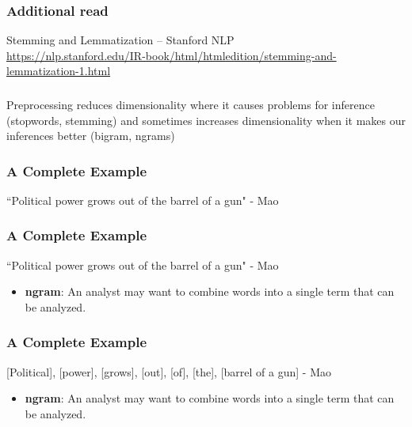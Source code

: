 \documentclass[compress, aspectratio=54]{beamer}
\begin{document}
\begin{frame}
\frametitle{Additional read}
Stemming and Lemmatization -- Stanford NLP\\
\url{https://nlp.stanford.edu/IR-book/html/htmledition/stemming-and-lemmatization-1.html}
\end{frame}

\begin{frame}
\frametitle{}
Preprocessing reduces dimensionality where it causes problems for
inference (stopwords, stemming) and sometimes increases
dimensionality when it makes our inferences better (bigram, ngrams)
\end{frame}

\begin{frame}
\frametitle{A Complete Example}
``Political power grows out of the barrel of a gun" - Mao
\end{frame}

\begin{frame}
\frametitle{A Complete Example}
``Political power grows out of the {\color{red}barrel of a gun}" - Mao
\begin{itemize}

\item \textbf{ngram}: An analyst may want to combine words into a single
term that can be analyzed.
\end{itemize}

\end{frame}

\begin{frame}
\frametitle{A Complete Example}
[Political], [power], [grows], [out], [of], [the], [{\color{red}barrel of a gun}] - Mao
\begin{itemize}

\item \textbf{ngram}: An analyst may want to combine words into a single
term that can be analyzed.
\end{itemize}

\end{frame}
\end{document}
